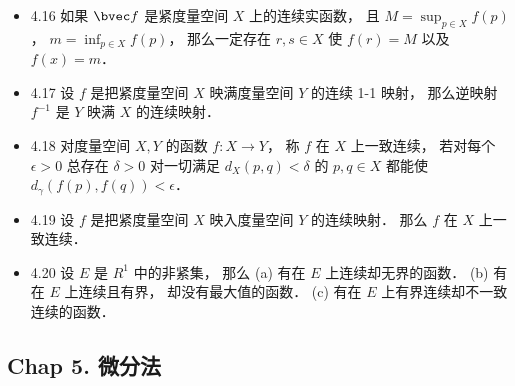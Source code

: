 \begin{itemize}
\item 4.16 如果 $\bvec f$ 是紧度量空间 $X$ 上的连续实函数， 且 $M = \sup_{p\in X} f(p)$， $m=\inf_{p\in X} f(p)$， 那么一定存在 $r,s\in X$ 使 $f(r)=M$ 以及 $f(x)=m$．

\item 4.17 设 $f$ 是把紧度量空间 $X$ 映满度量空间 $Y$ 的连续 1-1 映射， 那么逆映射 $f^{-1}$ 是 $Y$ 映满 $X$ 的连续映射．

\item 4.18 对度量空间 $X,Y$ 的函数 $f:X\to Y$， 称 $f$ 在 $X$ 上一致连续， 若对每个 $\epsilon>0$ 总存在 $\delta >0$ 对一切满足 $d_X(p,q)<\delta$ 的 $p,q\in X$ 都能使 $d_\gamma(f(p),f(q))<\epsilon$．

\item 4.19 设 $f$ 是把紧度量空间 $X$ 映入度量空间 $Y$ 的连续映射． 那么 $f$ 在 $X$ 上一致连续．

\item 4.20 设 $E$ 是 $R^1$ 中的非紧集， 那么 (a) 有在 $E$ 上连续却无界的函数． (b) 有在 $E$ 上连续且有界， 却没有最大值的函数． (c) 有在 $E$ 上有界连续却不一致连续的函数．
\end{itemize}


\subsection{Chap 5. 微分法}

